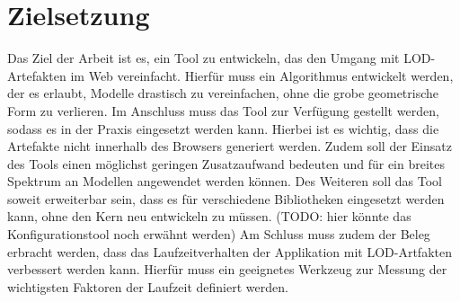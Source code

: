 \section{Zielsetzung}
Das Ziel der Arbeit ist es, ein Tool zu entwickeln, das den Umgang mit LOD-Artefakten im Web vereinfacht. Hierfür muss ein Algorithmus entwickelt werden, der es erlaubt, Modelle drastisch zu vereinfachen, ohne die grobe geometrische Form zu verlieren. Im Anschluss muss das Tool zur Verfügung gestellt werden, sodass es in der Praxis eingesetzt werden kann. Hierbei ist es wichtig, dass die Artefakte nicht innerhalb des Browsers generiert werden. Zudem soll der Einsatz des Tools einen möglichst geringen Zusatzaufwand bedeuten und für ein breites Spektrum an Modellen angewendet werden können. Des Weiteren soll das Tool soweit erweiterbar sein, dass es für verschiedene Bibliotheken eingesetzt werden kann, ohne den Kern neu entwickeln zu müssen. (TODO: hier könnte das Konfigurationstool noch erwähnt werden) Am Schluss muss zudem der Beleg erbracht werden, dass das Laufzeitverhalten der Applikation mit LOD-Artfakten verbessert werden kann. Hierfür muss ein geeignetes Werkzeug zur Messung der wichtigsten Faktoren der Laufzeit definiert werden.
